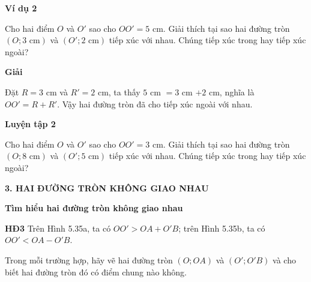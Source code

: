 \begin{lesson}
    \textbf{Ví dụ 2}

    Cho hai điểm $O$ và $O'$ sao cho $OO'=5$ cm. Giải thích tại sao hai đường tròn $(O;3\text{ cm})$ và $(O';2\text{ cm})$ tiếp xúc với nhau. Chúng tiếp xúc trong hay tiếp xúc ngoài?

    \textbf{Giải}

    Đặt $R=3$ cm và $R'=2$ cm, ta thấy $5$ cm $=3$ cm $+2$ cm, nghĩa là $OO'=R+R'$. Vậy hai đường tròn đã cho tiếp xúc ngoài với nhau.

    \textbf{Luyện tập 2}

    Cho hai điểm $O$ và $O'$ sao cho $OO'=3$ cm. Giải thích tại sao hai đường tròn $(O;8\text{ cm})$ và $(O';5\text{ cm})$ tiếp xúc với nhau. Chúng tiếp xúc trong hay tiếp xúc ngoài?

    \answerline
    \answerline

    \textbf{3. HAI ĐƯỜNG TRÒN KHÔNG GIAO NHAU}

    \textbf{Tìm hiểu hai đường tròn không giao nhau}

    \textbf{HĐ3} Trên Hình 5.35a, ta có $OO'>OA+O'B$; trên Hình 5.35b, ta có $OO'<OA-O'B$.

    Trong mỗi trường hợp, hãy vẽ hai đường tròn $(O;OA)$ và $(O';O'B)$ và cho biết hai đường tròn đó có điểm chung nào không.

    \begin{center}


\end{center}
\end{lesson}
